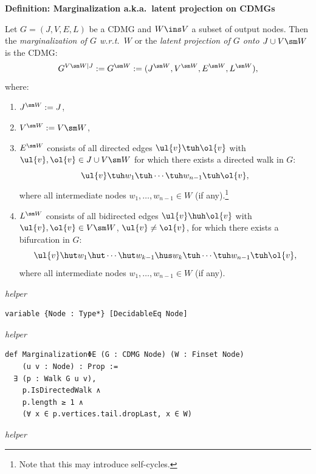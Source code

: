 \noindent\textbf{Definition: Marginalization a.k.a.\ latent projection on CDMGs}\par\smallskip
{\appendixTexSize
\label{def:G_marginalization}
  Let $G=(J,V,E,L)$ be a CDMG and $W \ins V$ a subset of output nodes.
  Then the \emph{marginalization of $G$ w.r.t.\ $W$} or the \emph{latent projection of $G$ onto $J\cup V \sm W$} is the CDMG:
  \[  G^{V\sm W | J} := G^{\sm W} := (J^{\sm W},V^{\sm W},E^{\sm W},L^{\sm W}), \] 
  where:
  \begin{enumerate}[label=\roman*.)]
      \item $J^{\sm W}:= J$,
      \item $V^{\sm W}:= V \sm W$,
      \item $E^{\sm W}$ consists of all directed edges $\ul{v} \tuh \ol{v}$ with $\ul{v},\ol{v} \in J \cup V \sm W$ 
          for which there exists a directed walk in $G$:
          \[\ul{v} \tuh w_1 \tuh \cdots \tuh w_{n-1} \tuh \ol{v}, \]
          where all intermediate nodes $w_1,\dots,w_{n-1} \in W$ (if any).\footnote{Note that this may introduce self-cycles.}
      \item $L^{\sm W}$ consists of all bidirected edges $\ul{v} \huh \ol{v}$ with 
          $\ul{v},\ol{v} \in V \sm W$, $\ul{v} \neq \ol{v}$, 
          for which there exists a bifurcation in $G$:
          \[\ul{v} \hut w_1 \hut \cdots \hut w_{k-1} \hus w_k \tuh \cdots \tuh w_{n-1} \tuh \ol{v}, \]
          where all intermediate nodes $w_1,\dots,w_{n-1} \in W$ (if any).
  \end{enumerate}
\par}
\smallskip
{\small\textit{helper}}
\begin{verbatim}
variable {Node : Type*} [DecidableEq Node]
\end{verbatim}
{\small\textit{helper}}
\begin{verbatim}
def MarginalizationΦE (G : CDMG Node) (W : Finset Node)
    (u v : Node) : Prop :=
  ∃ (p : Walk G u v),
    p.IsDirectedWalk ∧
    p.length ≥ 1 ∧
    (∀ x ∈ p.vertices.tail.dropLast, x ∈ W)
\end{verbatim}
{\small\textit{helper}}
